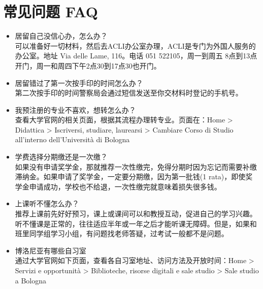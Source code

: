\chapter{常见问题 FAQ}              

\begin{itemize}


\item 居留自己没信心办，怎么办？\\
可以准备好一切材料，然后去ACLI办公室办理，ACLI是专门为外国人服务的办公室。地址 Via delle Lame, 116。电话 051 522105，周一到周五 8点到13点开门，周一和周四下午2点30到17点30也开门。

\item 居留错过了第一次按手印的时间怎么办？\\
第二次按手印的时间警察局会通过短信发送至你交材料时登记的手机号。


\item 我预注册的专业不喜欢，想转怎么办？\\
查看大学官网的相关页面，根据其流程办理转专业。页面在：Home > Didattica > Iscriversi, studiare, laurearsi > Cambiare Corso di Studio all'interno dell'Università di Bologna

\item 学费选择分期缴还是一次缴？\\
如果没有申请奖学金，那就推荐一次性缴完，免得分期时因为忘记而需要补缴滞纳金。如果申请了奖学金，一定要分期缴，因为第一批钱(1 rata)，即使奖学金申请成功，学校也不给退，一次性缴完就意味着损失很多钱。


\item 上课听不懂怎么办？\\
推荐上课前先好好预习，课上或课间可以和教授互动，促进自己的学习兴趣。听不懂课是正常的，往往适应半年或一年之后才能听课无障碍。但是，如果和班里同学组学习小组，有问题找老师答疑，过考试一般都不是问题。

\item 博洛尼亚有哪些自习室\\
通过大学官网如下页面，查看各自习室地址、访问方法及开放时间：Home > Servizi e opportunità > Biblioteche, risorse digitali e sale studio > Sale studio a Bologna
\end{itemize} 
